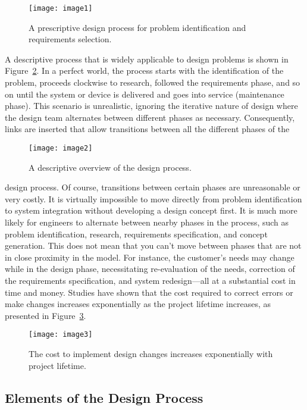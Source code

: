 \begin{figure}
\texttt{[image: image1]}
\caption{A prescriptive design process for problem
identification and requirements selection.}
\label{figure:prescriptiveDesign}
\end{figure}

A descriptive process that is widely applicable to design problems is
shown in Figure~\ref{figure:overviewDesignProcess}. 
In a perfect world, the process starts with the
identification of the problem, proceeds clockwise to research, followed
the requirements phase, and so on until the system or device is
delivered and goes into service (maintenance phase). This scenario is
unrealistic, ignoring the iterative nature of design where the design
team alternates between different phases as necessary. Consequently,
links are inserted that allow transitions between all the different
phases of the

\begin{figure}
\texttt{[image: image2]}
\caption{ A descriptive overview of the design process.}
\label{figure:overviewDesignProcess}
\end{figure}

design process. Of course, transitions between certain phases are
unreasonable or very costly. It is virtually impossible to move directly
from problem identification to system integration without developing a
design concept first. It is much more likely for engineers to alternate
between nearby phases in the process, such as problem identification,
research, requirements specification, and concept generation. This does
not mean that you can't move between phases that are not in close
proximity in the model. For instance, the customer's needs may change
while in the design phase, necessitating re-evaluation of the needs,
correction of the requirements specification, and system redesign---all
at a substantial cost in time and money. Studies have shown that the
cost required to correct errors or make changes increases exponentially
as the project lifetime increases, as presented in Figure~\ref{figure:costVsLife}.

\begin{figure}
\texttt{[image: image3]}
\caption{The cost to implement design changes increases exponentially with project lifetime.}
\label{figure:costVsLife}
\end{figure}

\subsection{Elements of the Design Process}

